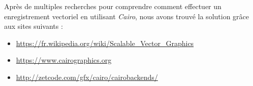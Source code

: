 \documentclass[a4]{article}
\begin{document}
Après de multiples recherches pour comprendre comment effectuer un enregistrement vectoriel en utilisant \emph{Cairo}, nous avons trouvé la solution grâce aux sites suivants : 
\vspace{0\baselineskip}  
\begin{itemize}
\item \url{https://fr.wikipedia.org/wiki/Scalable_Vector_Graphics}
\item \url{https://www.cairographics.org}
\item \url{http://zetcode.com/gfx/cairo/cairobackends/}
\end{itemize}
\end{document}
